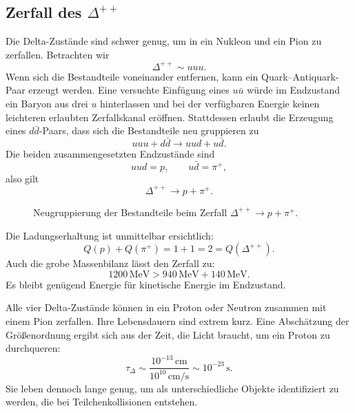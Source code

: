 \subsection{Zerfall des \texorpdfstring{\(\Delta^{++}\)}{Delta++}}

Die Delta-Zustände sind schwer genug, um in ein Nukleon und ein Pion zu zerfallen. Betrachten wir
\begin{equation}
\Delta^{++}\sim uuu.
\end{equation}
Wenn sich die Bestandteile voneinander entfernen, kann ein Quark--Antiquark-Paar erzeugt werden. Eine versuchte Einfügung eines \(u\bar u\) würde im Endzustand ein Baryon aus drei \(u\) hinterlassen und bei der verfügbaren Energie keinen leichteren erlaubten Zerfallskanal eröffnen. Stattdessen erlaubt die Erzeugung eines \(d\bar d\)-Paars, dass sich die Bestandteile neu gruppieren zu
\begin{equation}
uuu+d\bar d
\longrightarrow
uud+u\bar d.
\end{equation}
Die beiden zusammengesetzten Endzustände sind
\begin{equation}
uud=p,
\qquad
u\bar d=\pi^+,
\end{equation}
also gilt
\begin{equation}
\Delta^{++}\longrightarrow p+\pi^+.
\end{equation}

\begin{figure}[h]
\centering
{}
\caption{Neugruppierung der Bestandteile beim Zerfall \(\Delta^{++}\rightarrow p+\pi^+\).}
\end{figure}

Die Ladungserhaltung ist unmittelbar ersichtlich:
\begin{equation}
Q(p)+Q(\pi^+)=1+1=2=Q(\Delta^{++}).
\end{equation}
Auch die grobe Massenbilanz lässt den Zerfall zu:
\begin{equation}
1200\,\mathrm{MeV}
>
940\,\mathrm{MeV}+140\,\mathrm{MeV}.
\end{equation}
Es bleibt genügend Energie für kinetische Energie im Endzustand.

Alle vier Delta-Zustände können in ein Proton oder Neutron zusammen mit einem Pion zerfallen. Ihre Lebensdauern sind extrem kurz. Eine Abschätzung der Größenordnung ergibt sich aus der Zeit, die Licht braucht, um ein Proton zu durchqueren:
\begin{equation}
\tau_\Delta
\sim
\frac{10^{-13}\,\mathrm{cm}}
     {10^{10}\,\mathrm{cm/s}}
\sim10^{-23}\,\mathrm{s}.
\end{equation}
Sie leben dennoch lange genug, um als unterschiedliche Objekte identifiziert zu werden, die bei Teilchenkollisionen entstehen.

